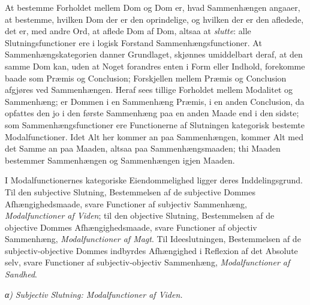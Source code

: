 \documentclass[12pt]{book}
\newcommand{\opage}[1]{\marginnote{\footnotesize\textit{[#1]}}}
\begin{document}
At bestemme Forholdet mellem Dom og Dom er, hvad
Sammenhængen angaaer, at bestemme, hvilken Dom der er
den oprindelige, og hvilken der er den afledede, det er, med
andre Ord, at aflede Dom af Dom, altsaa at \emph{slutte}: alle
Slutningsfunctioner ere i logisk Forstand Sammenhængsfunctioner.
At Sammenhængskategorien danner Grundlaget,
skjønnes umiddelbart deraf, at den samme Dom kan, uden at
Noget forandres enten i Form eller Indhold, forekomme
baade som Præmis og Conclusion; Forskjellen mellem
Præmis og Conclusion afgjøres ved Sammenhængen. Heraf
sees tillige Forholdet mellem Modalitet og Sammenhæng; er
Dommen i en Sammenhæng Præmis, i en anden Conclusion,
da opfattes den jo i den første Sammenhæng paa en anden
Maade end i den sidste; som Sammenhængsfunctioner ere
Functionerne af Slutningen kategorisk bestemte Modalfunctioner.
Idet Alt her kommer an paa Sammenhængen, kommer Alt
med det Samme an paa Maaden, altsaa paa
Sammenhængs\opage{293}maaden; thi Maaden bestemmer Sammenhængen og Sammenhængen
igjen Maaden.

I Modalfunctionernes kategoriske Eiendommelighed ligger
deres Inddelingsgrund. Til den subjective Slutning, Bestemmelsen
af de subjective Dommes Afhængighedsmaade, svare
Functioner af subjectiv Sammenhæng, \emph{Modalfunctioner
af Viden}; til den objective Slutning, Bestemmelsen af de objective
Dommes Afhængighedsmaade, svare Functioner af objectiv
Sammenhæng, \emph{Modalfunctioner af Magt}. Til
Ideeslutningen, Bestemmelsen af de subjectiv-objective Dommes
indbyrdes Afhængighed i Reflexion af det Absolute selv, svare
Functioner af subjectiv-objectiv Sammenhæng, \emph{Modalfunctioner
af Sandhed}.

\medskip
\noindent\textit{α)} \emph{Subjectiv Slutning: Modalfunctioner af Viden.}
\medskip
\end{document}
